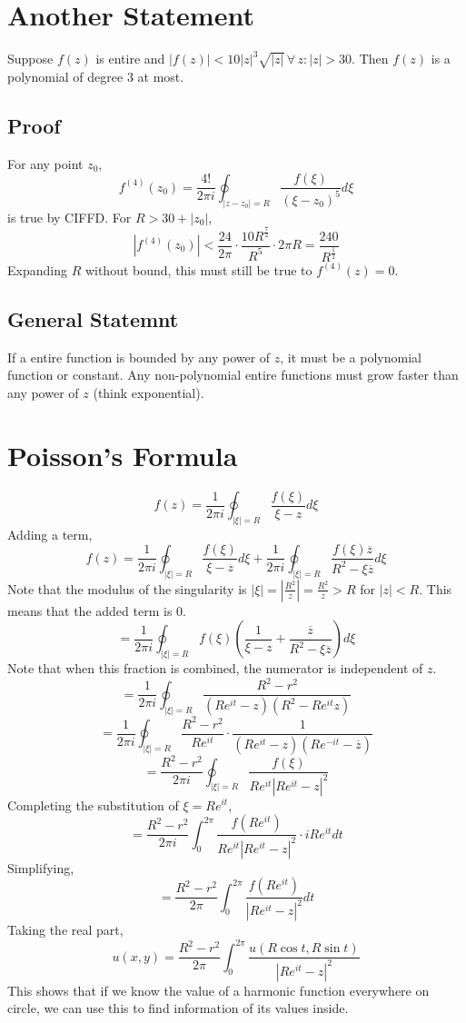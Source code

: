 \documentclass[../main.tex]{subfiles}
\begin{document}
\section{Another Statement}
Suppose $f(z)$ is entire and $|f(z)|<10|z|^{3}\sqrt{|z|}\,\forall\, z:|z|>30$.
Then $f(z)$ is a polynomial of degree 3 at most.

\subsection{Proof}
For any point $z_{0}$,
$$f^{(4)}(z_{0})=\frac{4!}{2\pi i}\oint_{|z-z_{0}|=R}\frac{f(\xi)}{(\xi-z_{0})^{5}}d\xi$$
is true by CIFFD. For $R > 30+|z_{0}|$,
$$|f^{(4)}(z_{0})|<\frac{24}{2\pi}\cdot\frac{10R^{\frac{7}{2}}}{R^{5}}\cdot 2\pi R=\frac{240}{R^{\frac{1}{2}}}$$
Expanding $R$ without bound, this must still be true to $f^{(4)}(z)=0$.

\subsection{General Statemnt}
If a entire function is bounded by any power of $z$, it must be a polynomial function or constant. Any non-polynomial 
entire functions must grow faster than any power of $z$ (think exponential).

\section{Poisson's Formula}
$$f(z)=\frac{1}{2\pi i}\oint_{|\xi|=R}\frac{f(\xi)}{\xi-z}d\xi$$
Adding a term,
$$f(z)=\frac{1}{2\pi i}\oint_{|\xi|=R}\frac{f(\xi)}{\xi-z}d\xi+\frac{1}{2\pi i}\oint_{|\xi|=R}\frac{f(\xi)\overline{z}}{R^{2}-\xi\overline{z}}d\xi$$
Note that the modulus of the singularity is $|\xi|=|\frac{R^{2}}{z}|=\frac{R^{2}}{z}>R$ for $|z|<R$. This means that the added term is $0$.
$$=\frac{1}{2\pi i}\oint_{|\xi|=R}f(\xi)\left(\frac{1}{\xi -z}+\frac{\overline{z}}{R^{2}-\xi\overline{z}}\right)d\xi$$
Note that when this fraction is combined, the numerator is independent of $z$. 
$$=\frac{1}{2\pi i}\oint_{|\xi|=R}\frac{R^{2}-r^{2}}{(Re^{it}-z)(R^{2}-Re^{it}z)}$$
$$=\frac{1}{2\pi i}\oint_{|\xi|=R}\frac{R^{2}-r^{2}}{Re^{it}}\cdot\frac{1}{(Re^{it}-z)(Re^{-it}-\overline{z})}$$
$$=\frac{R^{2}-r^{2}}{2\pi i}\oint_{|\xi|=R}\frac{f(\xi)}{Re^{it}|Re^{it}-z|^{2}}$$
Completing the substitution of $\xi=Re^{it}$,
$$=\frac{R^{2}-r^{2}}{2\pi i}\int_{0}^{2\pi}\frac{f(Re^{it})}{Re^{it}|Re^{it}-z|^{2}}\cdot iRe^{it}dt$$
Simplifying,
$$=\frac{R^{2}-r^{2}}{2\pi}\int_{0}^{2\pi}\frac{f(Re^{it})}{|Re^{it}-z|^{2}}dt$$
Taking the real part,
$$u(x,y)=\frac{R^{2}-r^{2}}{2\pi}\int_{0}^{2\pi}\frac{u(R\cos t, R\sin t)}{|Re^{it}-z|^{2}}$$
This shows that if we know the value of a harmonic function everywhere on circle, we can use this to find information of its values inside.
\end{document}
